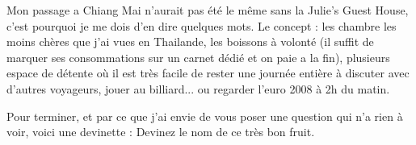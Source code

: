 \begin{multicols}{2}
Mon passage a Chiang Mai n'aurait pas été le même sans la Julie's Guest House, c'est pourquoi je me dois d'en dire quelques mots. Le concept : les chambre les moins chères que j'ai vues en Thailande, les boissons à volonté (il suffit de marquer ses consommations sur un carnet dédié et on paie a la fin), plusieurs espace de détente où il est très facile de rester une journée entière à discuter avec d'autres voyageurs, jouer au billiard... ou regarder l'euro 2008 à 2h du matin.


Pour terminer, et par ce que j'ai envie de vous poser une question qui n'a rien à voir, voici une devinette : Devinez le nom de ce très bon fruit.


\end{multicols}


